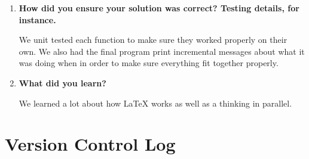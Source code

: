 \documentclass[letterpaper,10pt,titlepage,draftclsnofoot,onecolumn]{IEEEtran}
\begin{document}
\begin{enumerate}
\item \textbf{How did you ensure your solution was correct? Testing details, for instance.}

We unit tested each function to make sure they worked properly on their own. We also had the final program print incremental messages about what it was doing when in order to make sure everything fit together properly. \par

\item \textbf{What did you learn?}

We learned a lot about how LaTeX works as well as a thinking in parallel. \par

\end{enumerate}

\section{Version Control Log}
\end{document}
